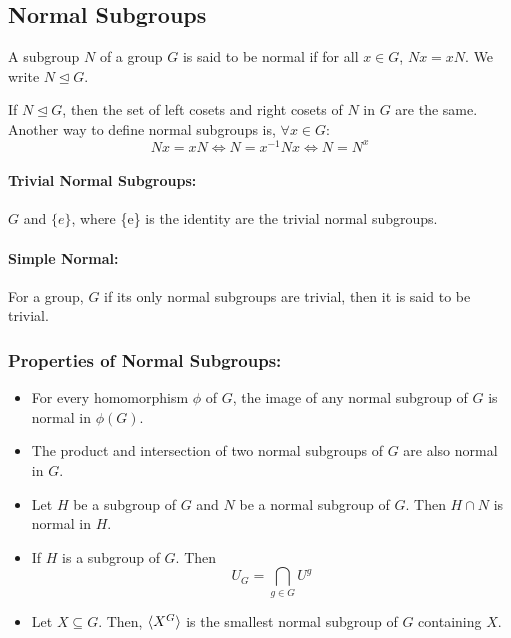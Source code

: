 \documentclass[12pt, oneside]{book}
\DeclarePairedDelimiter{\evdel}{\langle}{\rangle}
\newcommand{\ev}{\evdel}
\begin{document}
\subsection{Normal Subgroups}
A subgroup \(N\) of a group \(G\) is said to be normal if for all \(x \in G\), \(Nx = xN\).
We write \(N \trianglelefteq G\).

If \(N \trianglelefteq G\), then the set of left cosets and right cosets of \(N\) in \(G\) are the same.
Another way to define normal subgroups is, \( \forall x \in G\):
\[ Nx = xN \Longleftrightarrow N = x^{-1} Nx \Longleftrightarrow N = N^x \]

\paragraph{Trivial Normal Subgroups:} \(G\) and \( \{e\} \), where \{e\} is the identity are the trivial normal subgroups.
\paragraph{Simple Normal:} For a group, \(G\) if its only normal subgroups are trivial, then it is said to be trivial.

\subsubsection{Properties of Normal Subgroups:}
\begin{itemize}
	\item For every homomorphism \(\phi\) of \(G\), the image of any normal subgroup of \(G\) is normal in \(\phi\left(G\right)\).
	\item The product and intersection of two normal subgroups of \(G\) are also normal in \(G\).
	\item Let \(H\) be a subgroup of \(G\) and \(N\) be a normal subgroup of \(G\).
	      Then \(H \cap N\) is normal in \(H\).
	\item If \(H\) is a subgroup of \(G\).
	      Then \[U_G = \bigcap\limits_{g \in G} U^g\]
	\item Let \(X \subseteq G\). Then, \(\ev{X^G}\) is the smallest normal subgroup of \(G\) containing \(X\).
\end{itemize}
\end{document}
